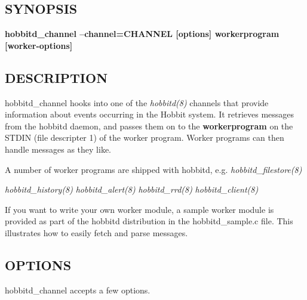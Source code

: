 \subsection{SYNOPSIS}
\textbf{hobbitd\_channel --channel=CHANNEL [options] workerprogram [worker-options]}


 
\subsection{DESCRIPTION}
 hobbitd\_channel hooks into one of the \emph{hobbitd(8)} channels
 that provide information about events occurring in the Hobbit
 system. It retrieves messages from the hobbitd daemon, and passes
 them on to the \textbf{workerprogram} on the STDIN (file descripter
 1) of the worker program. Worker programs can then handle messages as
 they like. 


  A number of worker programs are shipped with hobbitd,
  e.g. \emph{hobbitd\_filestore(8)}

 \emph{hobbitd\_history(8)}
 \emph{hobbitd\_alert(8)}
 \emph{hobbitd\_rrd(8)}
 \emph{hobbitd\_client(8)}



  If you want to write your own worker module, a sample worker module
  is provided as part of the hobbitd distribution in the
  hobbitd\_sample.c file. This illustrates how to easily fetch and
  parse messages. 



 
\subsection{OPTIONS}
 hobbitd\_channel accepts a few options. 

